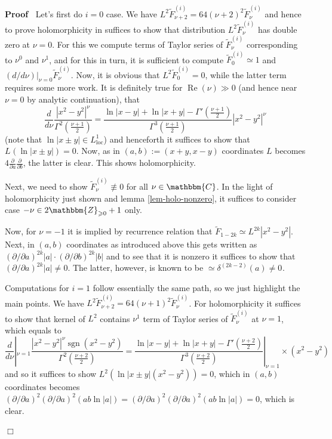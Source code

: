 \documentclass{article}
\newcommand{\assign}{:=}
\newcommand{\nequiv}{\not\equiv}
\newcommand{\nosymbol}{}
\newcommand{\tmop}[1]{\ensuremath{\operatorname{#1}}}
\newenvironment{proof}{\noindent\textbf{Proof\ }}{\hspace*{\fill}$\Box$\medskip}
\numberwithin{definition}{section}
\numberwithin{lemma}{section}
\numberwithin{proposition}{section}
{\theorembodyfont{\rmfamily}\newtheorem{remark}{Remark}
\numberwithin{remark}{section}
}
\begin{document}
\begin{proof}
  Let's first do $i = 0$ case. We have $L^2 \tilde{F}_{\nu + 2}^{( i)} = 64 (
  \nu + 2)^2 \tilde{F}_{\nu}^{( i)} \nosymbol$ and hence to prove
  holomorphicity in suffices to show that distribution $L^2 \tilde{F}_{\nu}^{(
  i)}$ has double zero at $\nu = 0$. For this we compute terms of Taylor
  series of $\tilde{F}_{\nu}^{( i)}$ corresponding to $\nu^0$ and $\nu^1$, and
  for this in turn, it is sufficient to compute $\tilde{F}^{( i)}_0 \simeq 1$
  and $( d / d \nu) |_{\nu = 0} \tilde{F}_{\nu}^{( i)}$. Now, it is obvious
  that $L^2 \tilde{F}^{( i)}_0 = 0$, while the latter term requires some more
  work. It is definitely true for $\tmop{Re} ( \nu) \gg 0$ (and hence near
  $\nu = 0$ by analytic continuation), that
  \[ \frac{d}{d \nu} \frac{| x^2 - y^2 |^{\nu}}{\Gamma^2 \left( \frac{\nu +
     1}{2} \right)} = \frac{\ln | x - y | + \ln | x + y | - \Gamma' \left(
     \frac{\nu + 1}{2} \right)}{\Gamma^3 \left( \frac{\nu + 1}{2} \right)} |
     x^2 - y^2 |^{\nu} \]
  (note that $\ln | x \pm y | \in L^1_{\tmop{loc}}$) and henceforth it
  suffices to show that $L^{} ( \ln | x \pm y |) = 0$. Now, as in $( a, b)
  \assign ( x + y, x - y)$ coordinates $L$ becomes $4 \frac{\partial}{\partial
  a} \frac{\partial}{\partial b}$, the latter is clear. This shows
  holomorphicity.
  
  Next, we need to show $\tilde{F}_{\nu}^{( i)} \nequiv 0$ for all $\nu \in
  \mathbbm{C}$. In the light of holomorphicity just shown and lemma
  \ref{lem-holo-nonzero}, it suffices to consider case $- \nu \in
  2\mathbbm{Z}_{\geqslant 0} + 1$ only.
  
  Now, for $\nu = - 1$ it is implied by recurrence relation that $\tilde{F}_{1
  - 2 k}^{} \simeq L^{2 k} | x^2 - y^2 |$. Next, in $( a, b)$ coordinates as
  introduced above this gets written as $( \partial / \partial a)^{2 k} | a |
  \cdot ( \partial / \partial b)^{2 k} | b |$ and to see that it is nonzero it
  suffices to show that $( \partial / \partial a)^{2 k} | a | \neq 0$. The
  latter, however, is known to be $\simeq \delta^{( 2 k - 2)} ( a) \neq 0^{}$.
  
  Computations for $i = 1$ follow essentially the same path, so we just
  highlight the main points. We have $L^2 \tilde{F}_{\nu + 2}^{( i)} = 64 (
  \nu + 1)^2 \tilde{F}_{\nu}^{( i)}$. For holomorphicity it suffices to show
  that kernel of $L^2$ contains $\nu^1$ term of Taylor series of
  $\tilde{F}_{\nu}^{( i)}$ at $\nu = 1$, which equals to
  \[ \frac{d}{d \nu} |_{\nu = 1} \frac{| x^2 - y^2 |^{\nu} \tmop{sgn} ( x^2 -
     y^2)}{\Gamma^2 \left( \frac{\nu + 2}{2} \right)} = \frac{\ln | x - y | +
     \ln | x + y | - \Gamma' \left( \frac{\nu + 2}{2} \right)}{\Gamma^3 \left(
     \frac{\nu + 2}{2} \right)} |_{\nu = 1} \times ( x^2 - y^2) \]
  and so it suffices to show $L^2 ( \ln | x \pm y | ( x^2 - y^2)) = 0$, which
  in $( a, b)$ coordinates becomes $( \partial / \partial a)^2 ( \partial /
  \partial a)^2 ( a b \ln | a |) = ( \partial / \partial a)^2 ( \partial /
  \partial a)^2 ( a b \ln | a |) = 0$, which is clear.
  

\end{proof}
\end{document}
